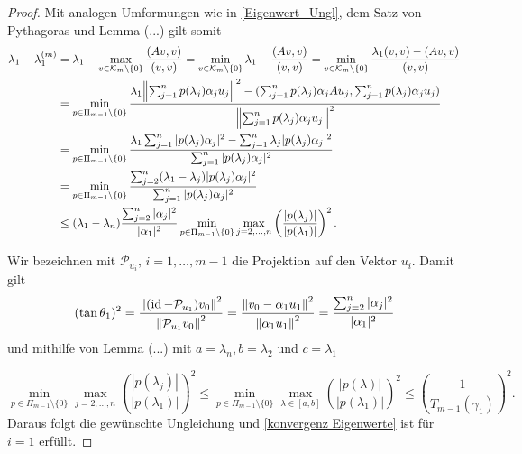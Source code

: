 \documentclass{article}
\begin{document}
\begin{theorem}
\begin{proof}
	Mit analogen Umformungen wie in \ref{Eigenwert_Ungl}, dem Satz von Pythagoras und Lemma (...) gilt somit
	\begin{equation}
		\label{Ungl i=1}
		\begin{aligned}
			\lambda_1 - \lambda_1^{(m)} &= \lambda_1 - \max_{v \in \mathcal{K}_m \setminus\{0\}} \frac{(Av,v)}{(v,v)} = \min_{v \in \mathcal{K}_m\setminus\{0\}} \lambda_1 - \frac{(Av,v)}{(v,v)} = \min_{v \in \mathcal{K}_m\setminus\{0\}} \frac{\lambda_1(v,v) - (Av,v)}{(v,v)} \\ &= \min_{p\in \Pi_{m-1}\setminus \{0\}} \frac{\lambda_1 {\left \| \sum_{j=1}^{n}p(\lambda_j)\alpha_j u_j \right \|}_{}^2 - (\sum_{j=1}^{n}p(\lambda_j)\alpha_j A u_j,\sum_{j=1}^{n}p(\lambda_j)\alpha_j u_j)}{{\left \| \sum_{j=1}^{n}p(\lambda_j)\alpha_j u_j \right \|}_{}^2} \\
			&= \min_{p\in \Pi_{m-1}\setminus \{0\}} \frac{\lambda_1 \sum_{j=1}^{n} |p(\lambda_j)\alpha_j|^2 - \sum_{j=1}^{n} \lambda_j |p(\lambda_j)\alpha_j|^2 }{\sum_{j=1}^{n} |p(\lambda_j)\alpha_j|^2} \\
			&=  \min_{p\in \Pi_{m-1}\setminus \{0\}} \frac{\sum_{j=2}^{n} (\lambda_1 - \lambda_j)|p(\lambda_j)\alpha_j|^2}{\sum_{j=1}^{n} |p(\lambda_j)\alpha_j|^2} \\
			&\le (\lambda_1 - \lambda_n) \frac{\sum_{j=2}^{n} |\alpha_j|^2}{|\alpha_1|^2} \min_{p\in \Pi_{m-1}\setminus \{0\}} \max_{j=2,\dots,n} \left(\frac{|p(\lambda_j)|}{|p(\lambda_1)|}\right)^2.
		\end{aligned}
	\end{equation}

	Wir bezeichnen mit $\mathcal{P}_{u_i}, \, i = 1,\dots, m-1$ die Projektion auf den Vektor $u_i$. Damit gilt
		\begin{equation*}
			(\tan\theta_1)^2 = \frac{{\left \| (\operatorname{id} - \mathcal{P}_{u_1})v_0 \right \|}_{}^2}{{\left \|  \mathcal{P}_{u_1}v_0 \right \|}_{}^2} = \frac{{\left \| v_0 - \alpha_1 u_1 \right \|}_{}^2}{{\left \| \alpha_1 u_1 \right \|}_{}^2} = \frac{\sum_{j=2}^{n} |\alpha_j|^2}{|\alpha_1|^2}
		\end{equation*}
	und mithilfe von Lemma (...) mit $a = \lambda_n, b= \lambda_2$ und $c= \lambda_1$

		\begin{equation*}
			\min_{p\in \Pi_{m-1}\setminus \{0\}} \max_{j=2,\dots,n} 		\left(\frac{|p(\lambda_j)|}{|p(\lambda_1)|}\right)^2 \le \min_{p\in \Pi_{m-1}\setminus \{0\}} \max_{\lambda \in [a,b]} \left(\frac{|p(\lambda)|}{|p(\lambda_1)|}\right)^2 \le \left(\frac{1}{T_{m-1}(\gamma_1)}\right)^2.
		\end{equation*}
	Daraus folgt die gewünschte Ungleichung und \ref{konvergenz Eigenwerte} ist für $i = 1$ erfüllt.


\end{proof}
\end{theorem}
\end{document}
